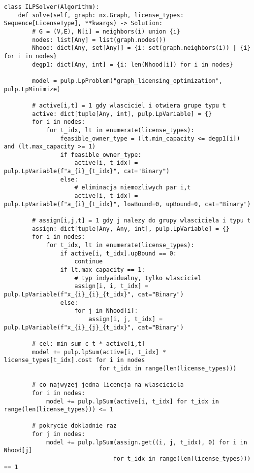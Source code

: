     {\footnotesize
        \begin{verbatim}
class ILPSolver(Algorithm):
    def solve(self, graph: nx.Graph, license_types: Sequence[LicenseType], **kwargs) -> Solution:
        # G = (V,E), N[i] = neighbors(i) union {i}
        nodes: list[Any] = list(graph.nodes())
        Nhood: dict[Any, set[Any]] = {i: set(graph.neighbors(i)) | {i} for i in nodes}
        degp1: dict[Any, int] = {i: len(Nhood[i]) for i in nodes}

        model = pulp.LpProblem("graph_licensing_optimization", pulp.LpMinimize)

        # active[i,t] = 1 gdy wlasciciel i otwiera grupe typu t
        active: dict[tuple[Any, int], pulp.LpVariable] = {}
        for i in nodes:
            for t_idx, lt in enumerate(license_types):
                feasible_owner_type = (lt.min_capacity <= degp1[i]) and (lt.max_capacity >= 1)
                if feasible_owner_type:
                    active[i, t_idx] = pulp.LpVariable(f"a_{i}_{t_idx}", cat="Binary")
                else:
                    # eliminacja niemozliwych par i,t
                    active[i, t_idx] = pulp.LpVariable(f"a_{i}_{t_idx}", lowBound=0, upBound=0, cat="Binary")

        # assign[i,j,t] = 1 gdy j nalezy do grupy wlasciciela i typu t
        assign: dict[tuple[Any, Any, int], pulp.LpVariable] = {}
        for i in nodes:
            for t_idx, lt in enumerate(license_types):
                if active[i, t_idx].upBound == 0:
                    continue
                if lt.max_capacity == 1:
                    # typ indywidualny, tylko wlasciciel
                    assign[i, i, t_idx] = pulp.LpVariable(f"x_{i}_{i}_{t_idx}", cat="Binary")
                else:
                    for j in Nhood[i]:
                        assign[i, j, t_idx] = pulp.LpVariable(f"x_{i}_{j}_{t_idx}", cat="Binary")

        # cel: min sum c_t * active[i,t]
        model += pulp.lpSum(active[i, t_idx] * license_types[t_idx].cost for i in nodes
                           for t_idx in range(len(license_types)))

        # co najwyzej jedna licencja na wlasciciela
        for i in nodes:
            model += pulp.lpSum(active[i, t_idx] for t_idx in range(len(license_types))) <= 1

        # pokrycie dokladnie raz
        for j in nodes:
            model += pulp.lpSum(assign.get((i, j, t_idx), 0) for i in Nhood[j]
                               for t_idx in range(len(license_types))) == 1


\end{verbatim}}
